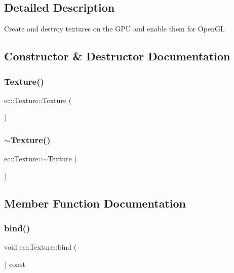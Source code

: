 \subsection{Detailed Description}
Create and destroy textures on the G\+PU and enable them for Open\+GL 

\subsection{Constructor \& Destructor Documentation}
\mbox{\label{classec_1_1_texture_ac2551ef676d0c771f35dc470b8a0b237}} 
\subsubsection{\texorpdfstring{Texture()}{Texture()}}
{\footnotesize\ttfamily ec\+::\+Texture\+::\+Texture (\begin{DoxyParamCaption}{ }\end{DoxyParamCaption})\hspace{0.3cm}{\ttfamily [explicit]}}

\mbox{\label{classec_1_1_texture_ae567d80654dd09c6b02a38ca8de29ead}} 
\subsubsection{\texorpdfstring{$\sim$\+Texture()}{~Texture()}}
{\footnotesize\ttfamily ec\+::\+Texture\+::$\sim$\+Texture (\begin{DoxyParamCaption}{ }\end{DoxyParamCaption})\hspace{0.3cm}{\ttfamily [default]}}



\subsection{Member Function Documentation}
\mbox{\label{classec_1_1_texture_a9e2f0191cfcc85c87edb821508cc06ee}} 
\subsubsection{\texorpdfstring{bind()}{bind()}}
{\footnotesize\ttfamily void ec\+::\+Texture\+::bind (\begin{DoxyParamCaption}{ }\end{DoxyParamCaption}) const}

